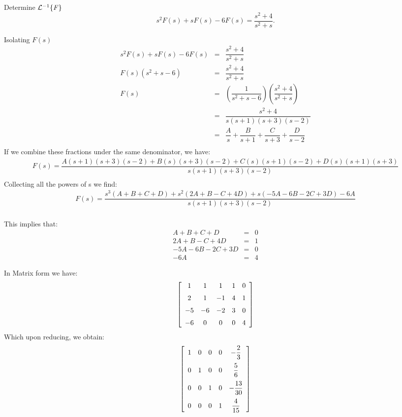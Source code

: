 \documentclass[11pt]{article}
\begin{document}
\begin{problem}
Determine ${\cal L}^{-1}\{ {\it F }\}$ 
\begin{equation*}
s^2 F(s) +sF(s)-6F(s) = \dfrac{s^2+4}{s^2+s}.
\end{equation*}
\end{problem}
\begin{solution}
Isolating $F(s)$
\begin{eqnarray*}
s^2 F(s) +sF(s)-6F(s) & = & \dfrac{s^2+4}{s^2+s} \\
F(s)(s^2+s-6) & = & \dfrac{s^2+4}{s^2+s} \\
F(s) & = & \left(\dfrac{1}{s^2+s-6}\right) \left(\dfrac{s^2+4}{s^2+s}\right) \\
 & = &  \dfrac{s^2+4}{s(s+1)(s+3)(s-2)}\\
 & = &  \dfrac{A}{s} + \dfrac{B}{s+1} + \dfrac{C}{s+3} + \dfrac{D}{s-2} \\
\end{eqnarray*}
If we combine these fractions under the same denominator, we have:
\begin{eqnarray*}
F(s)=\dfrac{A(s+1)(s+3)(s-2)+B(s)(s+3)(s-2)+C(s)(s+1)(s-2)+D(s)(s+1)(s+3)}{s(s+1)(s+3)(s-2)}  \\
\end{eqnarray*}
Collecting all the powers of s we find:
\begin{eqnarray*}
F(s)=\dfrac{s^3 (A+B+C+D) + s^2 (2A+B-C+4D) + s(-5A-6B-2C+3D)-6A }{s(s+1)(s+3)(s-2)}  \\
\end{eqnarray*}

This implies that:
\begin{eqnarray}
A+B+C+D & = & 0 \\
2A+B-C+4D & = & 1\\
-5A-6B-2C+3D & = & 0\\
-6A & = & 4
\end{eqnarray}

In Matrix form we have:
\begin{equation*}
 \left[ \begin {array}{ccccc} 1&1&1&1&0\\ \noalign{\medskip}2&1&-1&4&1
\\ \noalign{\medskip}-5&-6&-2&3&0\\ \noalign{\medskip}-6&0&0&0&4
\end {array} \right]
\end{equation*}
Which upon reducing, we obtain:
\begin{equation*}
 \left[ \begin {array}{ccccc} 1&0&0&0&- \dfrac{2}{3}\\ \noalign{\medskip}0&1&0&0
&\dfrac{5}{6}\\ \noalign{\medskip}0&0&1&0&-{\dfrac {13}{30}}
\\ \noalign{\medskip}0&0&0&1&{\dfrac {4}{15}}\end {array} \right]
\end{equation*}


\end{solution}
\end{document}
